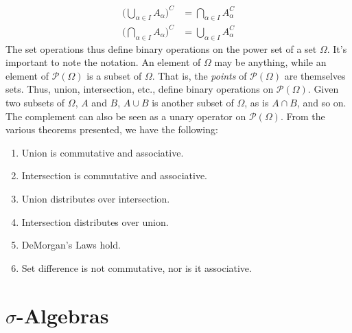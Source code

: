 \documentclass[crop=false,class=book,oneside]{standalone}
\begin{document}
            \begin{align}
                \Big(\bigcup_{\alpha\in{I}}A_{\alpha}\Big)^{C}
                &=\bigcap_{\alpha\in{I}}A_{\alpha}^{C}\\
                \Big(\bigcap_{\alpha\in{I}}A_{\alpha}\Big)^{C}
                &=\bigcup_{\alpha\in{I}}A_{\alpha}^{C}
            \end{align}
            The set operations thus define binary operations
            on the power set of a set $\Omega$. It's important
            to note the notation. An element of $\Omega$ may
            be anything, while an element of
            $\mathcal{P}(\Omega)$ is a subset of $\Omega$.
            That is, the \textit{points} of $\mathcal{P}(\Omega)$
            are themselves sets. Thus, union, intersection,
            etc., define binary operations on
            $\mathcal{P}(\Omega)$. Given two subsets of
            $\Omega$, $A$ and $B$, $A\cup{B}$ is another
            subset of $\Omega$, as is $A\cap{B}$, and so on.
            The complement can also be seen as a unary operator
            on $\mathcal{P}(\Omega)$. From the various theorems
            presented, we have the following:
            \begin{enumerate}
                \item Union is commutative and associative.
                \item Intersection is commutative and
                      associative.
                \item Union distributes over intersection.
                \item Intersection distributes over union.
                \item DeMorgan's Laws hold.
                \item Set difference is not commutative,
                      nor is it associative.
            \end{enumerate}
    \section{\texorpdfstring{$\sigma$}{Sigma}-Algebras}
\end{document}
